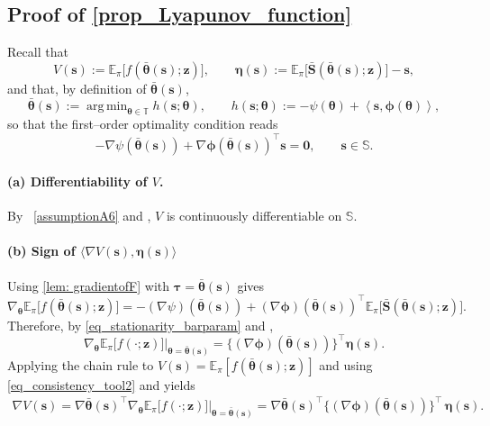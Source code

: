 \documentclass{article}
\newcommand{\zero}{\ensuremath{\mathbf{0}}}
\def\phib        {{\sbmm{\phi}}\XS}        \def\Phib       {{\sbmm{\Phi}}\XS}
\def\XS{\xspace}
\def\sbmm#1{\ensuremath{\boldsymbol{#1}}}
\def\eqdef{:=}
\def\PE{\mathbb{E}_\pi} %
\def\param{\vtheta}
\def\barparam{\bar{\param}}
\newcommand{\pscal}[2]{\left\langle#1,#2\right\rangle} %
\def\bars{\bar{\vS}}
\def\lyap{V}
\def\rvs{{\mathbf{s}}}
\def\rvz{{\mathbf{z}}}
\def\veta{{\bm{\eta}}}
\def\vtau{{\bm{\tau}}}
\def\vtheta{{\bm{\theta}}}
\def\vs{{\bm{s}}}
\def\vS{{\bm{S}}}
\def\sS{{\mathbb{S}}}
\def\sT{{\mathbb{T}}}
\DeclareMathOperator*{\argmin}{arg\,min}
\begin{document}
\subsection{Proof of \texorpdfstring{\cref{prop_Lyapunov_function}}{Proposition \ref*{prop_Lyapunov_function}}}\label{proof_prop_Lyapunov_function}

Recall that
\[
  \lyap(\rvs) \eqdef \PE\big[f(\barparam(\vs); \rvz)\big],
  \qquad
  \veta(\vs) \eqdef \PE\big[\bars(\barparam(\vs);\rvz)\big] - \rvs,
\]
and that, by definition of $\barparam(\vs)$,
\begin{equation}
  \label{eq_global_maximum_prop2}
  \barparam(\vs) 
  \eqdef \argmin_{\vtheta \in \sT} h(\vs;\vtheta),
  \qquad 
  h(\vs;\vtheta) \eqdef -\psi(\vtheta) + \pscal{\vs}{\phib(\vtheta)},
\end{equation}
so that the first–order optimality condition reads
\begin{equation}
  \label{eq_stationarity_barparam}
  -\nabla \psi(\barparam(\vs)) + \nabla \phib(\barparam(\vs))^\top \vs = \zero,
  \qquad \vs \in \sS.
\end{equation}

\paragraph{(a) Differentiability of $V$.}
By ~\cref{assumptionA6} and , $\lyap$ is continuously differentiable on $\sS$.

\paragraph{(b) Sign of $\langle \nabla \lyap(\vs), \veta(\vs)\rangle$}

Using \cref{lem: gradientofF} with $\vtau = \barparam(\vs)$ gives
\begin{equation}
  \label{eq_consistency_tool2}
  \nabla_\vtheta \PE\big[f(\barparam(\vs);\rvz)\big]
  = - (\nabla \psi)(\barparam(\vs))
    + (\nabla \phib)(\barparam(\vs))^\top \PE\big[\bars(\barparam(\vs);\rvz)\big].
\end{equation}
Therefore, by \cref{eq_stationarity_barparam} and , 
\begin{equation}
    \label{eq:GdtObjective}
    \nabla_\vtheta \PE\big[f(\cdot;\rvz)\big] \vert_{\vtheta = \barparam(\vs)} = \big\{(\nabla \phib)(\barparam(\vs))\big\}^\top\veta(\vs). 
\end{equation}
Applying the chain rule to $\lyap(\rvs) = \PE[f(\barparam(\vs);\rvz)]$ and using
\cref{eq_consistency_tool2} and  yields
\begin{align}
  \nabla \lyap(\vs) 
  = \nabla \barparam(\vs)^\top  \nabla_\vtheta \PE\big[f(\cdot;\rvz)\big] \vert_{\vtheta = \barparam(\vs)}
  = \nabla \barparam(\vs)^\top \big\{(\nabla \phib)(\barparam(\vs))\big\}^\top \, \veta(\vs).
  \label{eq_gradV_m}
\end{align}
\end{document}
